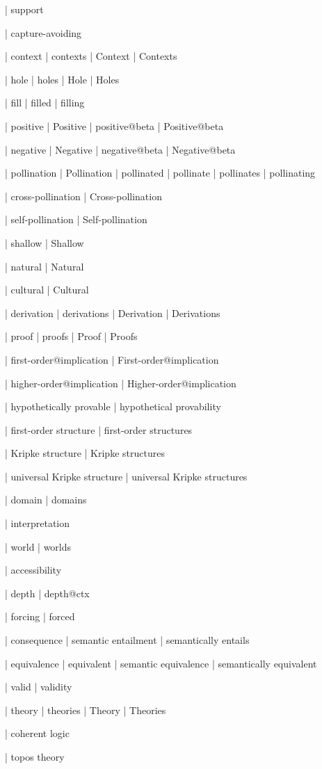  | support

 | capture-avoiding

 | context
 | contexts
 | Context
 | Contexts

 | hole
 | holes
 | Hole
 | Holes

 | fill
 | filled
 | filling

 | positive
 | Positive
 | positive@beta
 | Positive@beta

 | negative
 | Negative
 | negative@beta
 | Negative@beta

 | pollination
 | Pollination
 | pollinated
 | pollinate
 | pollinates
 | pollinating

 | cross-pollination
 | Cross-pollination

 | self-pollination
 | Self-pollination

 | shallow
 | Shallow

 | natural
 | Natural

 | cultural
 | Cultural

 | derivation
 | derivations
 | Derivation
 | Derivations

 | proof
 | proofs
 | Proof
 | Proofs
 
 | first-order@implication
 | First-order@implication

 | higher-order@implication
 | Higher-order@implication

 | hypothetically provable
 | hypothetical provability

 | first-order structure
 | first-order structures

 | Kripke structure
 | Kripke structures

 | universal Kripke structure
 | universal Kripke structures

 | domain
 | domains

 | interpretation

 | world
 | worlds

 | accessibility

 | depth
 | depth@ctx

 | forcing
 | forced

 | consequence
 | semantic entailment
 | semantically entails

 | equivalence
 | equivalent
 | semantic equivalence
 | semantically equivalent

 | valid
 | validity

 | theory
 | theories
 | Theory
 | Theories

 | coherent logic

 | topos theory